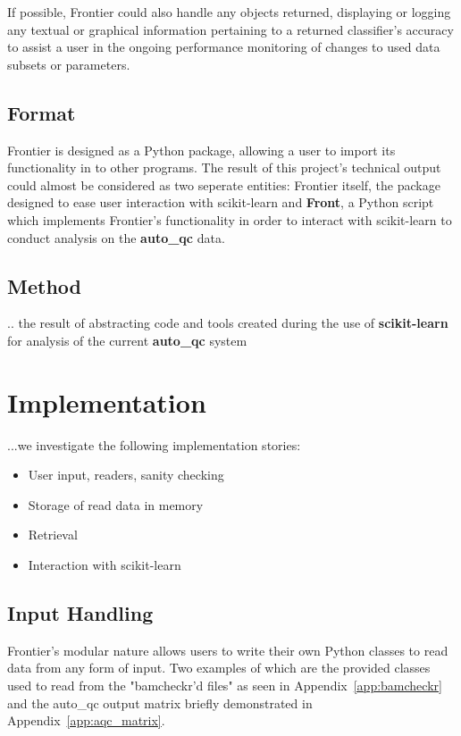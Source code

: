 If possible, Frontier could also handle any objects returned, displaying or
logging any textual or graphical information pertaining to a returned
classifier's accuracy to assist a user in the ongoing performance monitoring of
changes to used data subsets or parameters.


\subsection{Format}

Frontier is designed as a Python package, allowing a user to import its
functionality in to other programs. The result of this project's technical
output could almost be considered as two seperate entities: Frontier itself, the
package designed to ease user interaction with scikit-learn and \textbf{Front},
a Python script which implements Frontier's functionality in order to interact
with scikit-learn to conduct analysis on the \textbf{auto\_qc} data.


\subsection{Method}

.. the result of abstracting code and tools created during the use of
\textbf{scikit-learn} for analysis of the current \textbf{auto\_qc} system

\section{Implementation}
...we investigate the following implementation stories:

\begin{itemize}
    \item User input, readers, sanity checking
    \item Storage of read data in memory
    \item Retrieval
    \item Interaction with scikit-learn
\end{itemize}


\subsection{Input Handling}

Frontier's modular nature allows users to write their own Python classes to read
data from any form of input. Two examples of which are the provided classes used
to read from the "bamcheckr'd files" as seen in Appendix~\ref{app:bamcheckr} and
the auto\_qc output matrix briefly demonstrated in Appendix~\ref{app:aqc_matrix}.

